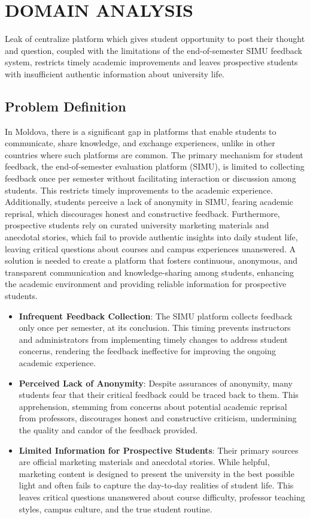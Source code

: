 \chapter{DOMAIN ANALYSIS}

Leak of centralize platform which gives student opportunity to post their thought and question, coupled with the limitations of the end-of-semester SIMU feedback system, restricts timely academic improvements and leaves prospective students with insufficient authentic information about university life.
\section{Problem Definition}

In Moldova, there is a significant gap in platforms that enable students to communicate,
share knowledge, and exchange experiences, unlike in other countries where
such platforms are common. The primary mechanism for student feedback, the
end-of-semester evaluation platform (SIMU), is limited to collecting feedback
once per semester without facilitating interaction or discussion among students.
This restricts timely improvements to the academic experience. Additionally,
students perceive a lack of anonymity in SIMU, fearing academic reprisal, which
discourages honest and constructive feedback. Furthermore, prospective students
rely on curated university marketing materials and anecdotal stories, which fail
to provide authentic insights into daily student life, leaving critical questions
about courses and campus experiences unanswered. A solution is needed to
create a platform that fosters continuous, anonymous, and transparent communication
and knowledge-sharing among students, enhancing the academic environment
and providing reliable information for prospective students. 

\begin{itemize}
    \item \textbf{Infrequent Feedback Collection}: The SIMU platform collects feedback only once per semester, at its conclusion. This timing prevents instructors and administrators from implementing timely changes to address student concerns, rendering the feedback ineffective for improving the ongoing academic experience.
    \item \textbf{Perceived Lack of Anonymity}: Despite assurances of anonymity, many students fear that their critical feedback could be traced back to them. This apprehension, stemming from concerns about potential academic reprisal from professors, discourages honest and constructive criticism, undermining the quality and candor of the feedback provided.
    \item \textbf{Limited Information for Prospective Students}: Their primary sources are official marketing materials and anecdotal stories. While helpful, marketing content is designed to present the university in the best possible light and often fails to capture the day-to-day realities of student life. This leaves critical questions unanswered about course difficulty, professor teaching styles, campus culture, and the true student routine.
\end{itemize}


